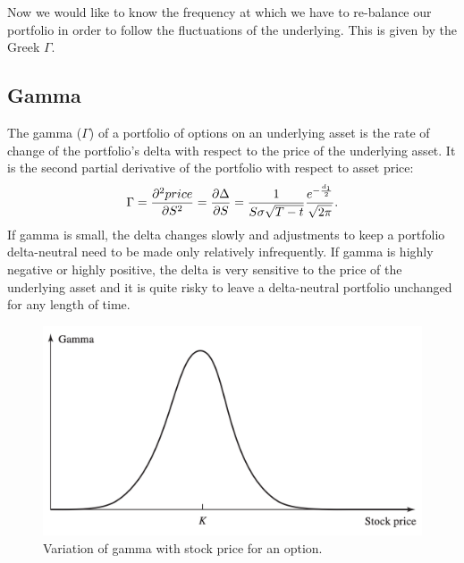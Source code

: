  Now we would like to know the frequency at which we have to re-balance our portfolio in order to follow the fluctuations of the underlying. This is given by the Greek $\Gamma$.

\subsection{Gamma} %
The gamma ($\Gamma$) of a portfolio of options on an underlying asset is the rate of change of the portfolio's delta with respect to the price of the underlying asset. It is the second partial derivative of the portfolio with respect to asset price:
\begin{equation}
    \Gamma = \pdv[2]{price}{S} = \pdv{\Delta}{S} = \dfrac{1}{S\sigma\sqrt{T-t}}\dfrac{e^{-\frac{d_1}{2}}}{\sqrt{2\pi}}.
\end{equation}
If gamma is small, the delta changes slowly and adjustments to keep a portfolio delta-neutral need to be made only relatively infrequently. If gamma is highly negative or highly positive, the delta is very sensitive to the price of the underlying asset and it is quite risky to leave a delta-neutral portfolio unchanged for any length of time.
\begin{figure}[htp]
    \centering
    \includegraphics[scale=0.2]{fig/tmp/fig14.png}
    \caption{Variation of gamma with stock price for an option.}
    \label{fig:gamma}
\end{figure}

